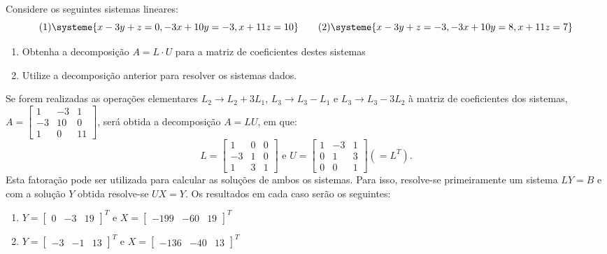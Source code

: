 \documentclass[12pt,a4paper]{article}
\begin{document}
\begin{ExerciseList}
\Exercise[title={2,0}]
Considere os seguintes sistemas lineares:
\[
(1)
\systeme{
x-3y+z=0,
-3x+10y=-3,
x+11z=10
}
\qquad
(2)
\systeme{
x-3y+z=-3,
-3x+10y=8,
x+11z=7
}
\]
\begin{enumerate}
\item Obtenha a decomposição $A = L \cdot U$ para a matriz de coeficientes destes sistemas
\item Utilize a decomposição anterior para resolver os sistemas dados.\vspace{-0.6cm}
\end{enumerate}
\Answer
Se forem realizadas as operações elementares $L_2 \to L_2 + 3L_1$, $L_3 \to L_3 - L_1$ e $L_3 \to L_3 - 3L_2$ à matriz de coeficientes dos sistemas, $A=
\begin{bmatrix}
 1 & -3 &  1\\
-3 & 10 &  0\\
 1 &  0 & 11
\end{bmatrix}$, será obtida a decomposição $A = L U$, em que:
\[
L=
\begin{bmatrix}
 1 & 0 &  0\\
-3 & 1 &  0\\
 1 & 3 &  1
\end{bmatrix}
\text{ e }
U =\begin{bmatrix}
1 & -3 & 1\\
0 &  1 & 3\\
0 &  0 & 1
\end{bmatrix} (= L^T).
\]
Esta fatoração pode ser utilizada para calcular as soluções de ambos os sistemas. Para isso, resolve-se primeiramente um sistema $LY=B$ e com a solução $Y$ obtida resolve-se $UX = Y$. Os resultados em cada caso serão os seguintes:

\begin{enumerate}
\item
$
 Y  =
\begin{bmatrix}
0 & -3 & 19
\end{bmatrix}^T
\text{ e }
X =\begin{bmatrix}
-199 & -60 & 19
\end{bmatrix}^T
$
\item
$
 Y  =
\begin{bmatrix}
-3 & -1 & 13
\end{bmatrix}^T
\text{ e }
 X  =
\begin{bmatrix}
-136 & -40 & 13
\end{bmatrix}^T
$
\end{enumerate}


\end{ExerciseList}
\end{document}
